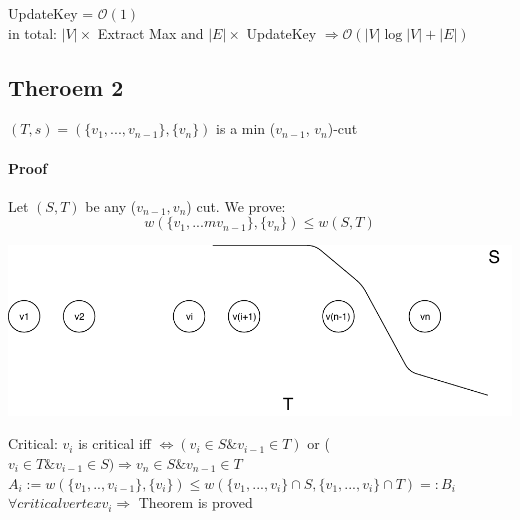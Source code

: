 UpdateKey = $\mathcal{O}(1)$ \\

in total: $|V| \times$ Extract Max and $|E| \times$ UpdateKey $\Rightarrow \mathcal{O}(|V| \log |V| + |E|)$


\subsection{Theroem 2}

$(T,s) = (\{v_1,...,v_{n-1}\}, \{v_n\})$ is a min ($v_{n-1}$, $v_n$)-cut

\paragraph{Proof}

Let $(S,T)$ be any ($v_{n-1},v_n$) cut. We prove: $$w(\{v_1,...mv_{n-1}\}, \{v_n\}) \leq w(S,T)$$
\begin{center}
\includegraphics[scale=1]{img/cut}
\end{center}

Critical: $v_i$ is critical iff $\Leftrightarrow (v_i \in S \& v_{i-1} \in T)$ or ($v_i \in T \& v_{i-1} \in S) \Rightarrow v_n \in S \& v_{n-1} \in T$ \\

$A_i := w(\{v_1,..,v_{i-1}\}, \{v_i\}) \leq w(\{v_1,...,v_{i}\} \cap S, \{v_1,...,v_i\}\cap T) =: B_i$ \\

$\forall critical vertex v_i \Rightarrow $ Theorem is proved \\

